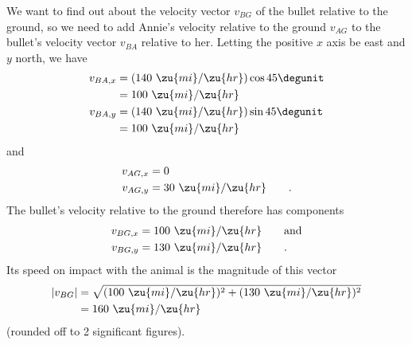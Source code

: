 We want to find out about the velocity vector $v_{BG}$ of
the bullet relative to the ground, so we need to add Annie's
velocity relative to the ground $v_{AG}$ to the bullet's
velocity vector $v_{BA}$ relative to her. Letting the
positive $x$ axis be east and $y$ north, we have
\begin{align*}
        v_{BA,x}     &=  (140\ \zu{mi}/\zu{hr}) \cos  45\degunit  \\
                     &=  100\ \zu{mi}/\zu{hr}  \\
        v_{BA,y}     &=  (140\ \zu{mi}/\zu{hr}) \sin  45\degunit  \\
                     &=  100\ \zu{mi}/\zu{hr}
\end{align*}
and
\begin{align*}
        v_{AG,x}     &=  0  \\
        v_{AG,y}     &=  30\ \zu{mi}/\zu{hr}   \qquad   .
\end{align*}
The bullet's velocity relative to the ground therefore has components
\begin{align*}
        v_{BG,x}     &=  100\ \zu{mi}/\zu{hr}   \qquad \text{and}  \\
        v_{BG,y}     &=  130\ \zu{mi}/\zu{hr}   \qquad   .
\end{align*}
Its speed on impact with the animal is the magnitude of this vector
\begin{align*}
        |v_{BG}|     &=  \sqrt{(100\ \zu{mi}/\zu{hr})^2+(130\ \zu{mi}/\zu{hr})^2}  \\
                 &=  160\ \zu{mi}/\zu{hr}
\end{align*}
(rounded off to 2 significant figures).
